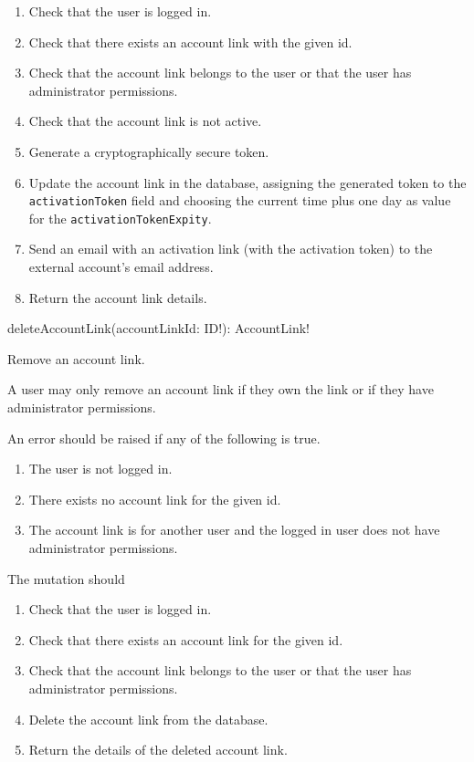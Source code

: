 \begin{enumerate}
    \item Check that the user is logged in.
    \item Check that there exists an account link with the given id.
    \item Check that the account link belongs to the user or that the user has administrator permissions.
    \item Check that the account link is not active.
    \item Generate a cryptographically secure token.
    \item Update the account link in the database, assigning the generated token to the \verb|activationToken| field and choosing the current time plus one day as value for the \verb|activationTokenExpity|.
    \item Send an email with an activation link (with the activation token) to the external account's email address.
    \item Return the account link details.
\end{enumerate}


\begin{code}
deleteAccountLink(accountLinkId: ID!): AccountLink!
\end{code}

Remove an account link.

\restrictions

A user may only remove an account link if they own the link or if they have administrator permissions.

\errors

An error should be raised if any of the following is true.

\begin{enumerate}
    \item The user is not logged in.
    \item There exists no account link for the given id.
    \item The account link is for another user and the logged in user does not have administrator permissions.
\end{enumerate}

\functionality

The mutation should

\begin{enumerate}
    \item Check that the user is logged in.
    \item Check that there exists an account link for the given id.
    \item Check that the account link belongs to the user or that the user has administrator permissions.
    \item Delete the account link from the database.
    \item Return the details of the deleted account link.
\end{enumerate}


